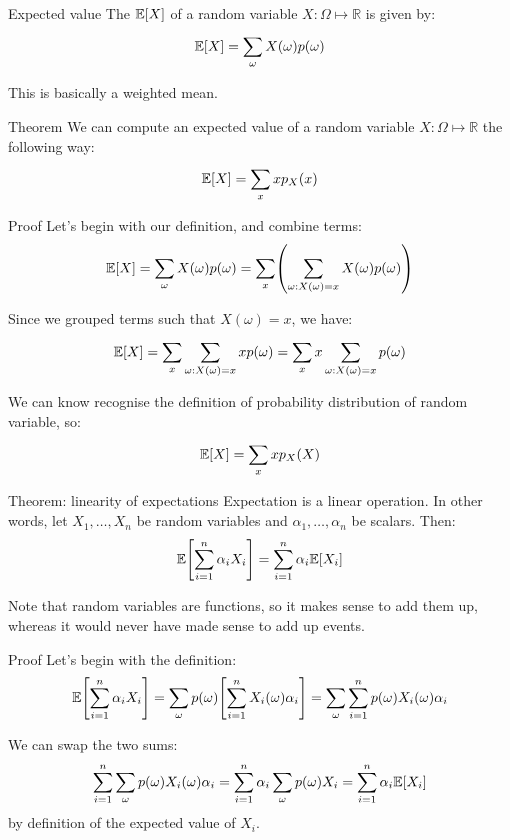 \documentclass[a4paper]{article}
\begin{document}
\begin{parag}{Expected value}
    The  $\exval\left[X\right]$ of a random variable $X : \Omega \mapsto \mathbb{R}$ is given by:
    \[\exval\left[X\right] = \sum_{\omega}^{} X\left(\omega\right)p\left(\omega\right) \]

     This is basically a weighted mean.
\end{parag}

\begin{parag}{Theorem}
    We can compute an expected value of a random variable $X : \Omega \mapsto \mathbb{R}$ the following way:
    \[\exval\left[X\right] = \sum_{x}^{} xp_X\left(x\right)\]

    \begin{subparag}{Proof}
        Let's begin with our definition, and combine terms:
        \[\exval\left[X\right] = \sum_{\omega}^{} X\left(\omega\right)p\left(\omega\right) = \sum_{x}^{} \left(\sum_{\omega : X\left(\omega\right) = x}^{} X\left(\omega\right) p\left(\omega\right)\right)\]

        Since we grouped terms such that $X\left(\omega\right) = x$, we have:
        \[\exval\left[X\right] = \sum_{x}^{} \sum_{\omega : X\left(\omega\right) = x}^{} x p\left(\omega\right) = \sum_{x}^{} x\sum_{\omega : X\left(\omega\right) = x}^{} p\left(\omega\right)\]

        We can know recognise the definition of probability distribution of random variable, so:
        \[\exval\left[X\right] = \sum_{x}^{} x p_X\left(X\right)\]
    \end{subparag}
\end{parag}


\begin{parag}{Theorem: linearity of expectations}
    Expectation is a linear operation. In other words, let $X_1, \ldots, X_n$ be random variables and $\alpha_1, \ldots, \alpha_n$ be scalars. Then:
    \[\exval\left[\sum_{i=1}^{n} \alpha_i X_i\right] = \sum_{i=1}^{n} \alpha_i \mathbb{E}\left[X_i\right]\]

    Note that random variables are functions, so it makes sense to add them up, whereas it would never have made sense to add up events.

    \begin{subparag}{Proof}
        Let's begin with the definition:
        \[\exval\left[\sum_{i=1}^{n} \alpha_i X_i\right] = \sum_{\omega}^{} p\left(\omega\right) \left[\sum_{i=1}^{n} X_i\left(\omega\right) \alpha_i\right] = \sum_{\omega}^{} \sum_{i=1}^{n} p\left(\omega\right) X_i\left(\omega\right) \alpha_i\]

        We can swap the two sums:
        \[\sum_{i=1}^{n} \sum_{\omega}^{} p\left(\omega\right)X_i\left(\omega\right)\alpha_i = \sum_{i=1}^{n} \alpha_i \sum_{\omega}^{} p\left(\omega\right)X_i = \sum_{i=1}^{n} \alpha_i \exval\left[X_i\right]\]
        by definition of the expected value of $X_i$.
    \end{subparag}

\end{parag}
\end{document}
